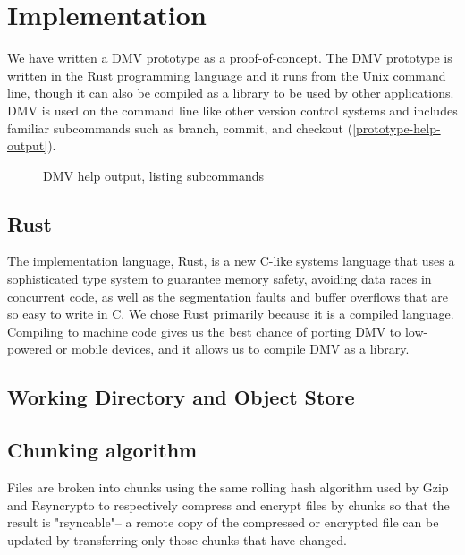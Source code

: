 \chapter{Implementation}

We have written a DMV prototype as a proof-of-concept. The DMV prototype is
written in the Rust programming language and it runs from the Unix command line,
though it can also be compiled as a library to be used by other applications.
DMV is used on the command line like other version control systems and includes
familiar subcommands such as branch, commit, and checkout
(\autoref{prototype-help-output}).

\begin{figure}[h]
    \caption{DMV help output, listing subcommands}
    \label{prototype-help-output}
    
\end{figure}



\section{Rust}

The implementation language, Rust, is a new C-like systems language that uses a
sophisticated type system to guarantee memory safety,
avoiding data races in concurrent code, as well as the segmentation faults and
buffer overflows that are so easy to write in C. We chose Rust primarily because
it is a compiled language. Compiling to machine code gives us the best chance of
porting DMV to low-powered or mobile devices, and it allows us to compile DMV as
a library.



\section{Working Directory and Object Store}




\section{Chunking algorithm}\label{chunking-algoritm}

Files are broken into chunks using the same rolling hash algorithm used by Gzip
and Rsyncrypto\cite{rsyncrypto_algorithm} to respectively compress and encrypt
files by chunks so that the result is "rsyncable"-- a remote copy of the
compressed or encrypted file can be updated by transferring only those chunks
that have changed.

